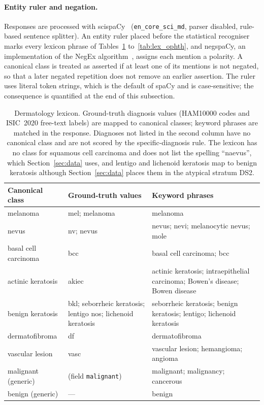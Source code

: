 \documentclass[11pt,a4paper]{article}
\begin{document}
\begin{appendices}
\paragraph{Entity ruler and negation.}
Responses are processed with scispaCy~\citep{neumann2019scispacy} (\texttt{en\_core\_sci\_md}, parser disabled, rule-based sentence splitter). An entity ruler placed before the statistical recogniser marks every lexicon phrase of Tables~\ref{tab:lex_derm} to~\ref{tab:lex_ophth}, and negspaCy, an implementation of the NegEx algorithm~\citep{chapman2001simple}, assigns each mention a polarity. A canonical class is treated as asserted if at least one of its mentions is not negated, so that a later negated repetition does not remove an earlier assertion. The ruler uses literal token strings, which is the default of spaCy and is case-sensitive; the consequence is quantified at the end of this subsection.

\begin{table}[tbp]
\centering
\caption{Dermatology lexicon. Ground-truth diagnosis values (HAM10000 codes and ISIC~2020 free-text labels) are mapped to canonical classes; keyword phrases are matched in the response. Diagnoses not listed in the second column have no canonical class and are not scored by the specific-diagnosis rule. The lexicon has no class for squamous cell carcinoma and does not list the spelling ``naevus'', which Section~\ref{sec:data} uses, and lentigo and lichenoid keratosis map to benign keratosis although Section~\ref{sec:data} places them in the atypical stratum DS2.}
\label{tab:lex_derm}
\small
\begin{tabular}{@{}p{3.1cm}p{3.5cm}p{6.6cm}@{}}
\toprule
Canonical class & Ground-truth values & Keyword phrases \\
\midrule
melanoma & mel; melanoma & melanoma \\
nevus & nv; nevus & nevus; nevi; melanocytic nevus; mole \\
basal cell carcinoma & bcc & basal cell carcinoma; bcc \\
actinic keratosis & akiec & actinic keratosis; intraepithelial carcinoma; Bowen's disease; Bowen disease \\
benign keratosis & bkl; seborrheic keratosis; lentigo nos; lichenoid keratosis & seborrheic keratosis; benign keratosis; lentigo; lichenoid keratosis \\
dermatofibroma & df & dermatofibroma \\
vascular lesion & vasc & vascular lesion; hemangioma; angioma \\
malignant (generic) & (field \texttt{malignant}) & malignant; malignancy; cancerous \\
benign (generic) & --- & benign \\
\bottomrule
\end{tabular}
\end{table}


\end{appendices}
\end{document}
